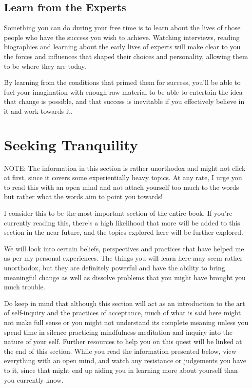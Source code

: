 \documentclass[
]{book}
\begin{document}
\hypertarget{learn-from-the-experts}{%
\section{Learn from the Experts}\label{learn-from-the-experts}}

Something you can do during your free time is to learn about the lives of those people who have the success you wish to achieve. Watching interviews, reading biographies and learning about the early lives of experts will make clear to you the forces and influences that shaped their choices and personality, allowing them to be where they are today.

By learning from the conditions that primed them for success, you'll be able to fuel your imagination with enough raw material to be able to entertain the idea that change is possible, and that success is inevitable if you effectively believe in it and work towards it.

\hypertarget{seeking-tranquility}{%
\chapter{Seeking Tranquility}\label{seeking-tranquility}}

NOTE: The information in this section is rather unorthodox and might not click at first, since it covers some experientially heavy topics. At any rate, I urge you to read this with an open mind and not attach yourself too much to the words but rather what the words aim to point you towards!

I consider this to be the most important section of the entire book. If you're currently reading this, there's a high likelihood that more will be added to this section in the near future, and the topics explored here will be further explored.

We will look into certain beliefs, perspectives and practices that have helped me as per my personal experiences. The things you will learn here may seem rather unorthodox, but they are definitely powerful and have the ability to bring meaningful change as well as dissolve problems that you might have brought you much trouble.

Do keep in mind that although this section will act as an introduction to the art of self-inquiry and the practices of acceptance, much of what is said here might not make full sense or you might not understand its complete meaning unless you spend time in silence practicing mindfulness meditation and inquiry into the nature of your self. Further resources to help you on this quest will be linked at the end of this section. While you read the information presented below, view everything with an open mind, and watch any resistance or judgements you have to it, since that might end up aiding you in learning more about yourself than you currently know.
\end{document}
